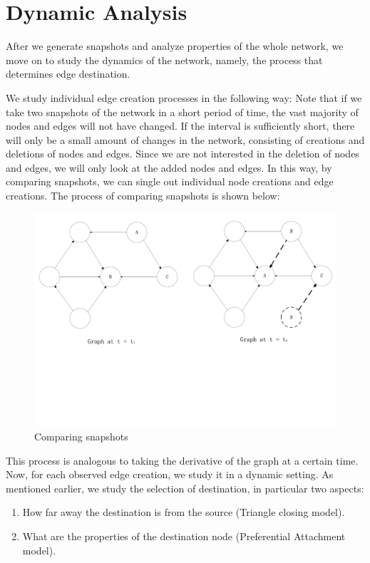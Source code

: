\documentclass[10pt,twocolumn]{article}
\begin{document}
\section{Dynamic Analysis}
After we generate snapshots and analyze properties of the whole network, we move on to study the dynamics of the network, namely, the process that determines edge destination.

We study individual edge creation processes in the following way: Note that if we take two snapshots of the network in a short period of time, the vast majority of nodes and edges will not have changed. If the interval is sufficiently short, there will only be a small amount of changes in the network, consisting of creations and deletions of nodes and edges. Since we are not interested in the deletion of nodes and edges, we will only look at the added nodes and edges. In this way, by comparing snapshots, we can single out individual node creations and edge creations. The process of comparing snapshots is shown below:
\begin{figure}[ht]
    \centering
        \includegraphics[scale = 0.25, trim = 0cm 8cm 0cm 0cm]{./graphs/dynamic.pdf}
    \caption{Comparing snapshots} \label{fig:compare}
\end{figure}

This process is analogous to taking the derivative of the graph at a certain time. Now, for each observed edge creation, we study it in a dynamic setting. As mentioned earlier, we study the selection of destination, in particular two aspects:
\begin{enumerate}
\item How far away the destination is from the source (Triangle closing model).
\item What are the properties of the destination node (Preferential Attachment model).
\end{enumerate}
\end{document}
